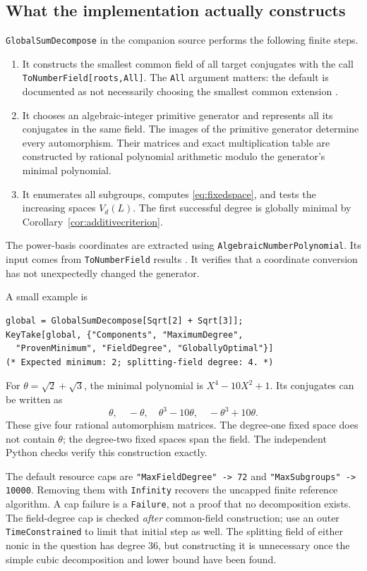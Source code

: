 \documentclass[11pt,a4paper]{article}
\newcommand{\code}[1]{\texttt{#1}}
\theoremstyle{definition}
\theoremstyle{remark}
\begin{document}
\subsection{What the implementation actually constructs}
\code{GlobalSumDecompose} in the companion source performs the following finite steps.
\begin{enumerate}
\item It constructs the smallest common field of all target conjugates with the call \code{ToNumberField[roots,All]}. The \code{All} argument matters: the default is documented as not necessarily choosing the smallest common extension \cite{tonumberfield}.
\item It chooses an algebraic-integer primitive generator and represents all its conjugates in the same field. The images of the primitive generator determine every automorphism. Their matrices and exact multiplication table are constructed by rational polynomial arithmetic modulo the generator's minimal polynomial.
\item It enumerates all subgroups, computes \eqref{eq:fixedspace}, and tests the increasing spaces $V_d(L)$. The first successful degree is globally minimal by Corollary~\ref{cor:additivecriterion}.
\end{enumerate}
The power-basis coordinates are extracted using \code{AlgebraicNumberPolynomial}. Its input comes from \code{ToNumberField} results \cite{anpoly}. It verifies that a coordinate conversion has not unexpectedly changed the generator.

A small example is
\begin{lstlisting}
global = GlobalSumDecompose[Sqrt[2] + Sqrt[3]];
KeyTake[global, {"Components", "MaximumDegree",
  "ProvenMinimum", "FieldDegree", "GloballyOptimal"}]
(* Expected minimum: 2; splitting-field degree: 4. *)
\end{lstlisting}
For $\theta=\sqrt2+\sqrt3$, the minimal polynomial is $X^4-10X^2+1$. Its conjugates can be written as
\[
 \theta,\quad-\theta,\quad\theta^3-10\theta,
 \quad-\theta^3+10\theta.
\]
These give four rational automorphism matrices. The degree-one fixed space does not contain $\theta$; the degree-two fixed spaces span the field. The independent Python checks verify this construction exactly.

The default resource caps are \code{"MaxFieldDegree" -> 72} and \code{"MaxSubgroups" -> 10000}. Removing them with \code{Infinity} recovers the uncapped finite reference algorithm. A cap failure is a \code{Failure}, not a proof that no decomposition exists. The field-degree cap is checked \emph{after} common-field construction; use an outer \code{TimeConstrained} to limit that initial step as well. The splitting field of either nonic in the question has degree 36, but constructing it is unnecessary once the simple cubic decomposition and lower bound have been found.
\end{document}
